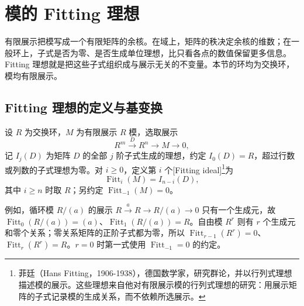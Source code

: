 
\section{模的 Fitting 理想}
\label{b3:sec:1203}

有限展示把模写成一个有限矩阵的余核。在域上，矩阵的秩决定余核的维数；在一般环上，子式是否为零、是否生成单位理想，比只看各点的数值保留更多信息。Fitting 理想就是把这些子式组织成与展示无关的不变量。本节的环均为交换环，模均有限展示。


\subsection{Fitting 理想的定义与基变换}
\label{b3:subsec:1203:01}

\begin{definition}\label{b3:def:fitting-ideals}
	设 \(R\) 为交换环，\(M\) 为有限展示 \(R\) 模，选取展示
	\[
		R^m\xrightarrow{D}R^n\longrightarrow M\longrightarrow0,
	\]
	记 \(I_j(D)\) 为矩阵 \(D\) 的全部 \(j\) 阶子式生成的理想，约定 \(I_0(D)=R\)，超过行数或列数的子式理想为零。对 \(i\ge0\)，定义第 \(i\) 个[Fitting ideal]\footnote{菲廷（Hans Fitting，1906-1938），德国数学家，研究群论，并以行列式理想描述模的展示。这些理想来自他对有限展示模的行列式理想的研究：用展示矩阵的子式记录模的生成关系，而不依赖所选展示。}为
	\[
		\operatorname{Fitt}_i(M)=I_{n-i}(D),
	\]
	其中 \(i\ge n\) 时取 \(R\)；另约定 \(\operatorname{Fitt}_{-1}(M)=0\)。
\end{definition}

例如，循环模 \(R/(a)\) 的展示 \(R\xrightarrow{a}R\to R/(a)\to0\) 只有一个生成元，故 \(\operatorname{Fitt}_0(R/(a))=(a)\)、\(\operatorname{Fitt}_1(R/(a))=R\)。自由模 \(R^r\) 则有 \(r\) 个生成元和零个关系；零关系矩阵的正阶子式都为零，所以 \(\operatorname{Fitt}_{r-1}(R^r)=0\)、\(\operatorname{Fitt}_r(R^r)=R\)。\(r=0\) 时第一式使用 \(\operatorname{Fitt}_{-1}=0\) 的约定。

